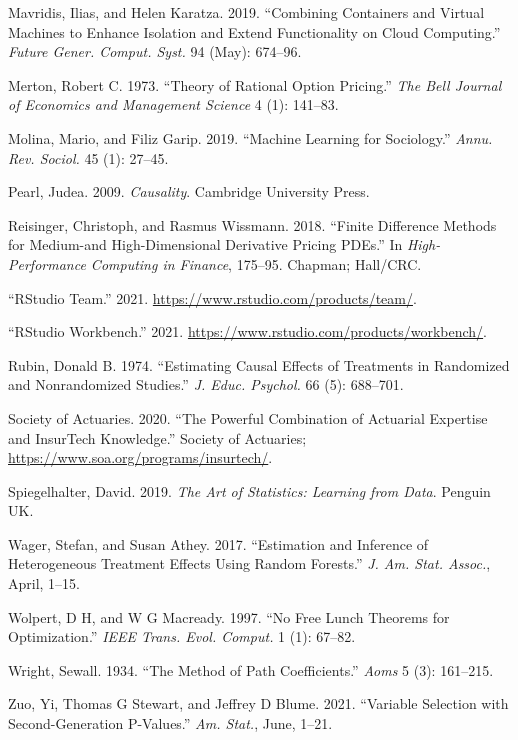 \documentclass{article}
\begin{document}
\leavevmode\hypertarget{ref-Mavridis2019}{}%
Mavridis, Ilias, and Helen Karatza. 2019. ``Combining Containers and
Virtual Machines to Enhance Isolation and Extend Functionality on Cloud
Computing.'' \emph{Future Gener. Comput. Syst.} 94 (May): 674--96.

\leavevmode\hypertarget{ref-Merton1973}{}%
Merton, Robert C. 1973. ``Theory of Rational Option Pricing.'' \emph{The
Bell Journal of Economics and Management Science} 4 (1): 141--83.

\leavevmode\hypertarget{ref-Molina2019}{}%
Molina, Mario, and Filiz Garip. 2019. ``Machine Learning for
Sociology.'' \emph{Annu. Rev. Sociol.} 45 (1): 27--45.

\leavevmode\hypertarget{ref-Pearl2009}{}%
Pearl, Judea. 2009. \emph{Causality}. Cambridge University Press.

\leavevmode\hypertarget{ref-Reisinger2018}{}%
Reisinger, Christoph, and Rasmus Wissmann. 2018. ``Finite Difference
Methods for Medium-and High-Dimensional Derivative Pricing PDEs.'' In
\emph{High-Performance Computing in Finance}, 175--95. Chapman;
Hall/CRC.

\leavevmode\hypertarget{ref-RStudioT2021}{}%
``RStudio Team.'' 2021. \url{https://www.rstudio.com/products/team/}.

\leavevmode\hypertarget{ref-RStudioW2021}{}%
``RStudio Workbench.'' 2021.
\url{https://www.rstudio.com/products/workbench/}.

\leavevmode\hypertarget{ref-Rubin1974}{}%
Rubin, Donald B. 1974. ``Estimating Causal Effects of Treatments in
Randomized and Nonrandomized Studies.'' \emph{J. Educ. Psychol.} 66 (5):
688--701.

\leavevmode\hypertarget{ref-SOA2020}{}%
Society of Actuaries. 2020. ``The Powerful Combination of Actuarial
Expertise and InsurTech Knowledge.'' Society of Actuaries;
\url{https://www.soa.org/programs/insurtech/}.

\leavevmode\hypertarget{ref-Spiegelhalter2019}{}%
Spiegelhalter, David. 2019. \emph{The Art of Statistics: Learning from
Data}. Penguin UK.

\leavevmode\hypertarget{ref-Wager2017}{}%
Wager, Stefan, and Susan Athey. 2017. ``Estimation and Inference of
Heterogeneous Treatment Effects Using Random Forests.'' \emph{J. Am.
Stat. Assoc.}, April, 1--15.

\leavevmode\hypertarget{ref-Wolpert1997}{}%
Wolpert, D H, and W G Macready. 1997. ``No Free Lunch Theorems for
Optimization.'' \emph{IEEE Trans. Evol. Comput.} 1 (1): 67--82.

\leavevmode\hypertarget{ref-Wright1934}{}%
Wright, Sewall. 1934. ``The Method of Path Coefficients.'' \emph{Aoms} 5
(3): 161--215.

\leavevmode\hypertarget{ref-Zuo2021}{}%
Zuo, Yi, Thomas G Stewart, and Jeffrey D Blume. 2021. ``Variable
Selection with Second-Generation P-Values.'' \emph{Am. Stat.}, June,
1--21.



\end{document}

